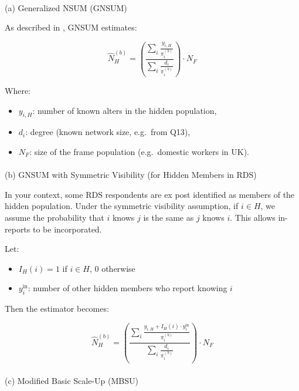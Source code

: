 \documentclass[
  12pt,
  letterpaper,
  DIV=11,
  numbers=noendperiod]{scrartcl}
\makeatletter
\let\oldparagraph\paragraph
\renewcommand{\paragraph}{
    \@ifstar
      \xxxParagraphStar
      \xxxParagraphNoStar
  }
\newcommand{\xxxParagraphStar}[1]{\oldparagraph*{#1}\mbox{}}
\newcommand{\xxxParagraphNoStar}[1]{\oldparagraph{#1}\mbox{}}
\theoremstyle{plain}
\theoremstyle{definition}
\makeatother
\begin{document}
\paragraph{(a) Generalized NSUM (GNSUM)}\label{a-generalized-nsum-gnsum}

As described in \textcite{feeh16-generaling}, GNSUM estimates:

\[\hat{N}_H^{(b)} = \left( \frac{\sum_{i} \frac{y_{i,H}}{\pi_i^{(b)}}}{\sum_{i} \frac{d_i}{\pi_i^{(b)}}} \right) \cdot N_F\]

Where:

\begin{itemize}
\item
  \(y_{i,H}\): number of known alters in the hidden population,
\item
  \(d_i\): degree (known network size, e.g.~from Q13),
\item
  \(N_F\): size of the frame population (e.g.~domestic workers in UK).
\end{itemize}

\paragraph{(b) GNSUM with Symmetric Visibility (for Hidden Members in
RDS)}\label{b-gnsum-with-symmetric-visibility-for-hidden-members-in-rds}

In your context, some RDS respondents are ex post identified as members
of the hidden population. Under the symmetric visibility assumption, if
\(i \in H\), we assume the probability that \(i\) knows \(j\) is the
same as \(j\) knows \(i\). This allows in-reports to be incorporated.

Let:

\begin{itemize}
\item
  \(I_H(i) = 1\) if \(i \in H\), 0 otherwise
\item
  \(y_{i}^{\text{in}}\): number of other hidden members who report
  knowing \(i\)
\end{itemize}

Then the estimator becomes:

\[\hat{N}_H^{(b)} = \left( \frac{\sum_{i} \frac{y_{i,H} + I_H(i) \cdot y_{i}^{\text{in}}}{\pi_i^{(b)}}}{\sum_{i} \frac{d_i}{\pi_i^{(b)}}} \right) \cdot N_F\]

\paragraph{(c) Modified Basic Scale-Up
(MBSU)}\label{c-modified-basic-scale-up-mbsu}
\end{document}
